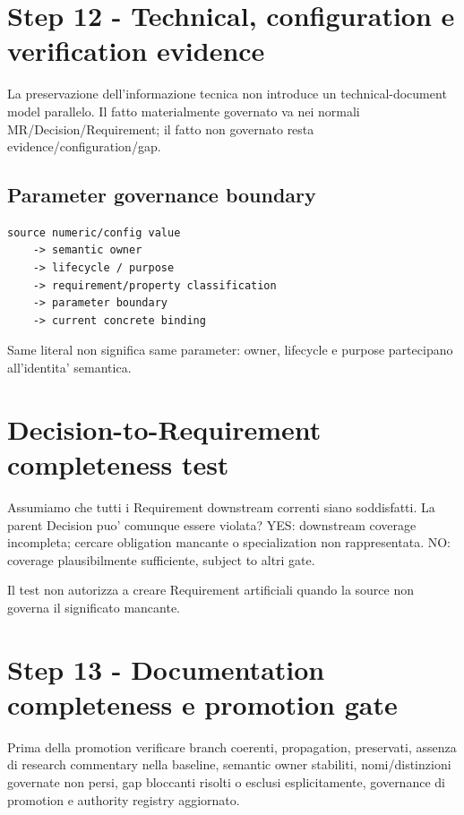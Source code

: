 \documentclass[11pt,a4paper]{article}
\begin{document}
\section{Step 12 - Technical, configuration e verification evidence}
\holdouttag

La preservazione dell'informazione tecnica non introduce un technical-document model parallelo. Il fatto materialmente governato va nei normali MR/Decision/Requirement; il fatto non governato resta evidence/configuration/gap.

\subsection{Parameter governance boundary}
\holdouttag
\begin{lstlisting}
source numeric/config value
    -> semantic owner
    -> lifecycle / purpose
    -> requirement/property classification
    -> parameter boundary
    -> current concrete binding
\end{lstlisting}

Same literal non significa same parameter: owner, lifecycle e purpose partecipano all'identita' semantica.

\section{Decision-to-Requirement completeness test}
\holdouttag

\begin{ddtacheck}[title={Counterexample gate}]
Assumiamo che tutti i Requirement downstream correnti siano soddisfatti. La parent Decision puo' comunque essere violata? YES: downstream coverage incompleta; cercare obligation mancante o specialization non rappresentata. NO: coverage plausibilmente sufficiente, subject to altri gate.
\end{ddtacheck}

Il test non autorizza a creare Requirement artificiali quando la source non governa il significato mancante.

\section{Step 13 - Documentation completeness e promotion gate}
\closedtag

Prima della promotion verificare branch coerenti, propagation, \NS{} preservati, assenza di research commentary nella baseline, semantic owner stabiliti, nomi/distinzioni governate non persi, gap bloccanti risolti o esclusi esplicitamente, governance di promotion e authority registry aggiornato.
\end{document}

